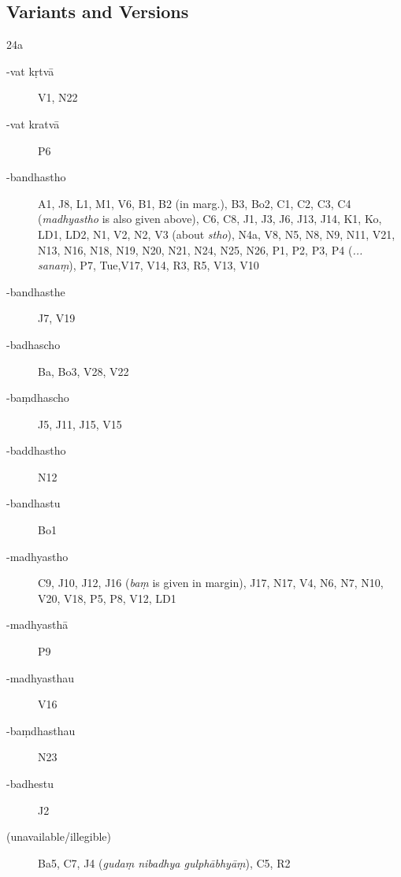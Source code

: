 ﻿

\newcommand{\myfn}[1]{\footnote{\texteng{#1}}}
\setlength{\footmarkwidth}{1.3em}
\setlength{\footmarksep}{0em}
\setlength{\footparindent}{1.3em}
\usepackage{fnpos}
\makeFNbottom

\def\sthana{}


\pagestyle{HPed} %
\begin{ekdosis}

  \chapter{Variants and Versions}

  \sthana{24a}

  \begin{marma}[hp01_024]
    \begin{description}
    \item[-vat kṛtvā]{V1, N22}
    \item[-vat kratvā]{P6}
    \item[-bandhastho]{A1, J8, L1, M1, V6, B1, B2 (in marg.), B3, Bo2, C1, C2, C3, C4 (\emph{madhyastho} is also given above), C6, C8, J1, J3, J6, J13, J14, K1, Ko, LD1, LD2, N1, V2, N2, V3 (about \emph{stho}), N4a, V8, N5, N8, N9, N11, V21, N13, N16, N18, N19, N20, N21, N24, N25, N26, P1, P2, P3, P4 (\emph{... sanaṃ}), P7, Tue,V17, V14, R3, R5, V13, V10}
    \item[-bandhasthe]{J7, V19}
    \item[-badhascho]{Ba, Bo3, V28, V22}
    \item[-baṃdhascho]{J5, J11, J15, V15}
    \item[-baddhastho]{N12}
    \item[-bandhastu]{Bo1}
    \item[-madhyastho]{C9, J10, J12, J16 (\emph{baṃ} is given in margin), J17, N17, V4, N6, N7, N10, V20, V18, P5, P8, V12, LD1}
    \item[-madhyasthā]{P9}
    \item[-madhyasthau]{V16}
    \item[-baṃdhasthau]{N23}
    \item[-badhestu]{J2}
    \item[(unavailable/illegible)]{Ba5, C7, J4 (\emph{gudaṃ nibadhya gulphābhyāṃ}), C5, R2}
    \end{description}
  \end{marma}



\end{ekdosis}
